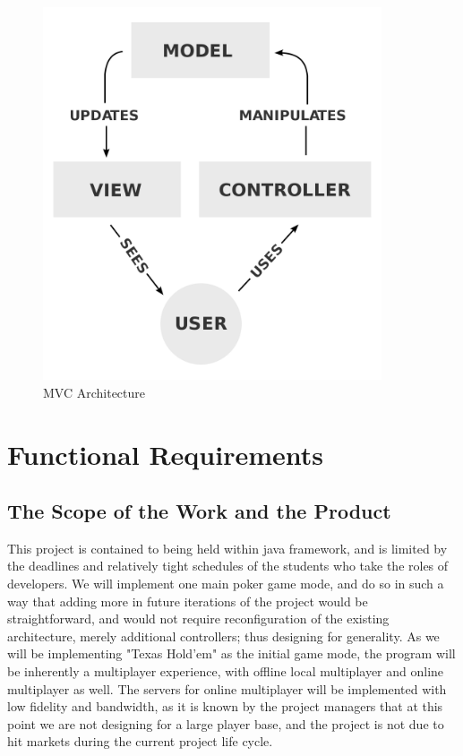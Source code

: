 \documentclass[12pt, titlepage]{article}
\begin{document}
\begin{figure}
    \centering
    \includegraphics[width=10cm]{MVC-Process.svg.png}
    \caption{MVC Architecture}
\end{figure}

\section{Functional Requirements}

\subsection{The Scope of the Work and the Product}
    This project is contained to being held within java framework, and is limited by the deadlines and relatively tight schedules of the students who take the roles of developers. We will implement one main poker game mode, and do so in such a way that adding more in future iterations of the project would be straightforward, and would not require reconfiguration of the existing architecture, merely additional controllers; thus designing for generality. As we will be implementing "Texas Hold'em" as the initial game mode, the program will be inherently a multiplayer experience, with offline local multiplayer and online multiplayer as well. The servers for online multiplayer will be implemented with low fidelity and bandwidth, as it is known by the project managers that at this point we are not designing for a large player base, and the project is not due to hit markets during the current project life cycle.
    
\end{document}
